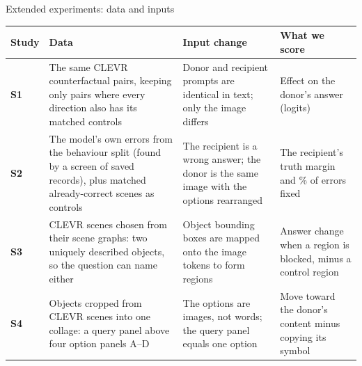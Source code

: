 \documentclass[aspectratio=169,12pt]{beamer}
\begin{document}
\begin{frame}{Extended experiments: data and inputs}
\scriptsize
\renewcommand{\arraystretch}{1.25}
\begin{tabularx}{\textwidth}{@{}>{\bfseries}p{0.9cm}>{\raggedright\arraybackslash}X>{\raggedright\arraybackslash}X>{\raggedright\arraybackslash}p{3.4cm}@{}}
\toprule
Study & Data & Input change & What we score \\
\midrule
S1 & The same CLEVR counterfactual pairs, keeping only pairs where every direction also has its matched controls & Donor and recipient prompts are identical in text; only the image differs & Effect on the donor's answer (logits) \\
S2 & The model's own errors from the behaviour split (found by a screen of saved records), plus matched already-correct scenes as controls & The recipient is a wrong answer; the donor is the same image with the options rearranged & The recipient's truth margin and \% of errors fixed \\
S3 & CLEVR scenes chosen from their scene graphs: two uniquely described objects, so the question can name either & Object bounding boxes are mapped onto the image tokens to form regions & Answer change when a region is blocked, minus a control region \\
S4 & Objects cropped from CLEVR scenes into one collage: a query panel above four option panels A--D & The options are images, not words; the query panel equals one option & Move toward the donor's content minus copying its symbol \\
\bottomrule
\end{tabularx}
\end{frame}
\end{document}
